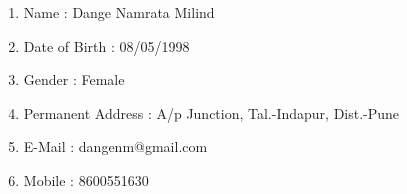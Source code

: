 \documentclass[11pt,fleqn]{book} %
\begin{document}
\newpage
\begin{enumerate}
\begingroup
\thispagestyle{empty}
\par\normalfont\fontsize{20}{15}\sffamily\selectfont\color{white}
\vspace*{2cm}
    \item Name : Dange Namrata Milind\\[0.5cm]
    \item Date of Birth : 08/05/1998\\[0.5cm]
    \item Gender : Female\\[0.5cm] 
    \item Permanent Address : A/p Junction, Tal.-Indapur, Dist.-Pune\\[0.5cm]
    \item E-Mail : dangenm@gmail.com\\[0.5cm]
    \item Mobile : 8600551630
\end{enumerate}
\endgroup
\end{document}
